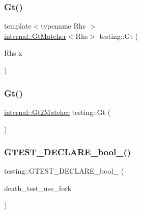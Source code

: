 \mbox{\label{namespacetesting_a493fc1bafd7b3945ba06ace80e74b0d5}} 
\subsubsection{\texorpdfstring{Gt()}{Gt()}\hspace{0.1cm}{\footnotesize\ttfamily [1/2]}}
{\footnotesize\ttfamily template$<$typename Rhs $>$ \\
\hyperlink{classtesting_1_1internal_1_1_gt_matcher}{internal\+::\+Gt\+Matcher}$<$Rhs$>$ testing\+::\+Gt (\begin{DoxyParamCaption}\item[{Rhs}]{x }\end{DoxyParamCaption})\hspace{0.3cm}{\ttfamily [inline]}}

\mbox{\label{namespacetesting_a3eaae6408f77ba7d87ca2d6a21dbde77}} 
\subsubsection{\texorpdfstring{Gt()}{Gt()}\hspace{0.1cm}{\footnotesize\ttfamily [2/2]}}
{\footnotesize\ttfamily \hyperlink{classtesting_1_1internal_1_1_gt2_matcher}{internal\+::\+Gt2\+Matcher} testing\+::\+Gt (\begin{DoxyParamCaption}{ }\end{DoxyParamCaption})\hspace{0.3cm}{\ttfamily [inline]}}

\mbox{\label{namespacetesting_a534f0743e7c42c55d27dcd0dd3d38f18}} 
\subsubsection{\texorpdfstring{G\+T\+E\+S\+T\+\_\+\+D\+E\+C\+L\+A\+R\+E\+\_\+bool\+\_\+()}{GTEST\_DECLARE\_bool\_()}\hspace{0.1cm}{\footnotesize\ttfamily [1/9]}}
{\footnotesize\ttfamily testing\+::\+G\+T\+E\+S\+T\+\_\+\+D\+E\+C\+L\+A\+R\+E\+\_\+bool\+\_\+ (\begin{DoxyParamCaption}\item[{death\+\_\+test\+\_\+use\+\_\+fork}]{ }\end{DoxyParamCaption})}

